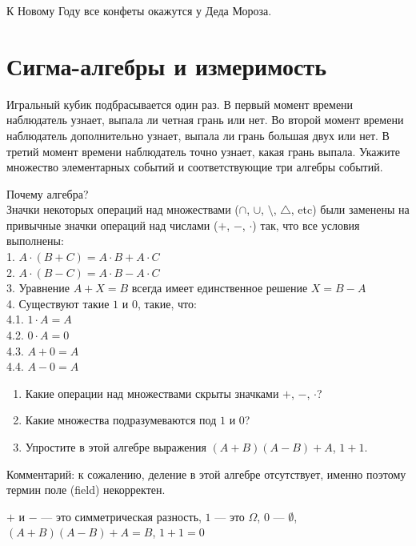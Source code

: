 \begin{solution}
К Новому Году все конфеты окажутся у Деда Мороза. 
\end{solution}



\section{Сигма-алгебры и измеримость} 

\begin{problem}
Игральный кубик подбрасывается один раз. В первый момент времени
наблюдатель узнает, выпала ли четная грань или нет. Во второй
момент времени наблюдатель дополнительно узнает, выпала ли грань большая двух
или нет. В третий момент времени наблюдатель точно узнает, какая
грань выпала. Укажите множество элементарных событий и
соответствующие три алгебры событий. 

\end{problem} 
\begin{solution} 


\end{solution}

\begin{problem}
 Почему алгебра? \\
Значки некоторых операций над множествами ($\cap$, $\cup$,
$\setminus$, $\triangle$, etc) были заменены на привычные значки
операций над числами ($+$, $-$, $\cdot$) так, что все условия выполнены: \\
1. $A\cdot(B+C)=A\cdot B+A\cdot C$ \\
2. $A\cdot(B-C)=A\cdot B-A\cdot C$ \\
3. Уравнение $A+X=B$ всегда имеет единственное решение $X=B-A$ \\
4. Существуют такие $1$ и $0$, такие, что: \\
4.1. $1\cdot A=A$ \\
4.2. $0\cdot A=0$ \\
4.3. $A+0=A$ \\
4.4. $A-0=A$ 
\begin{enumerate}
\item Какие операции над множествами скрыты значками $+$, $-$,
$\cdot$? 
\item Какие множества подразумеваются под $1$ и $0$? 
\item Упростите в этой алгебре выражения $(A+B)(A-B)+A$, $1+1$. 
\end{enumerate}
Комментарий: к сожалению, деление в этой алгебре отсутствует,
именно поэтому термин поле (field) некорректен. 
\end{problem} 
\begin{solution} 
$+$ и $-$ --- это симметрическая разность, $1$ --- это $\Omega$, $0$ --- $\emptyset$, $(A+B)(A-B)+A=B$, $1+1=0$
\end{solution}

